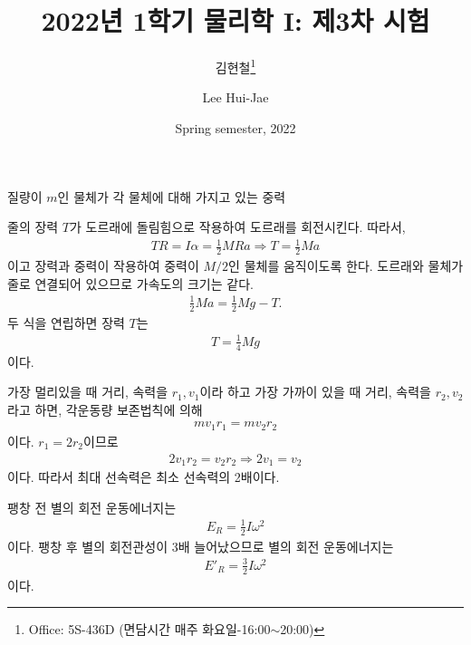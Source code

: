 \documentclass[floatfix,nofootinbib,superscriptaddress,fleqn]{revtex4-2}
\begin{document}
\title{\Large 2022년 1학기 물리학 I: 제3차 시험}
\author{김현철\footnote{Office: 5S-436D (면담시간 매주
    화요일-16:00$\sim$20:00)}} 
\author{Lee Hui-Jae} 
\date{Spring semester, 2022}


\maketitle
 
질량이 $m$인 물체가 각 물체에 대해 가지고 있는 중력 

\vspace{1cm}
 

\vspace{1cm} 
줄의 장력 $T$가 도르래에 돌림힘으로 작용하여 도르래를 회전시킨다. 따라서,
\begin{align}
  TR = I\alpha = \frac{1}{2}MRa \Longrightarrow T =\frac{1}{2}Ma
\end{align}    
이고 장력과 중력이 작용하여 중력이 $M/2$인 물체를 움직이도록 한다.
도르래와 물체가 줄로 연결되어 있으므로 가속도의 크기는 같다.
\begin{align}
  \frac{1}{2}Ma = \frac{1}{2}Mg - T.
\end{align}
두 식을 연립하면 장력 $T$는
\begin{align}
  T = \frac{1}{4}Mg
\end{align}
이다.

 

\vspace{1cm} 
가장 멀리있을 때 거리, 속력을 $r_1, v_1$이라 하고
가장 가까이 있을 때 거리, 속력을 $r_2, v_2$라고 하면,
각운동량 보존법칙에 의해 
\begin{align}
  mv_1r_1 = mv_2r_2
\end{align}
이다. $r_1 = 2r_2$이므로
\begin{align}
  2v_1r_2 = v_2r_2\Longrightarrow 2v_1 = v_2
\end{align}
이다. 따라서 최대 선속력은 최소 선속력의 2배이다.
\vspace{1cm}
 

\vspace{1cm} 

팽창 전 별의 회전 운동에너지는
\begin{align}
  E_R = \frac{1}{2}I\omega^2
\end{align}
이다. 팽창 후 별의 회전관성이 3배 늘어났으므로 별의 회전 운동에너지는
\begin{align}
  E'_R=\frac{3}{2}I\omega^2
\end{align}
이다.
\vspace{1cm}
 
\end{document}
